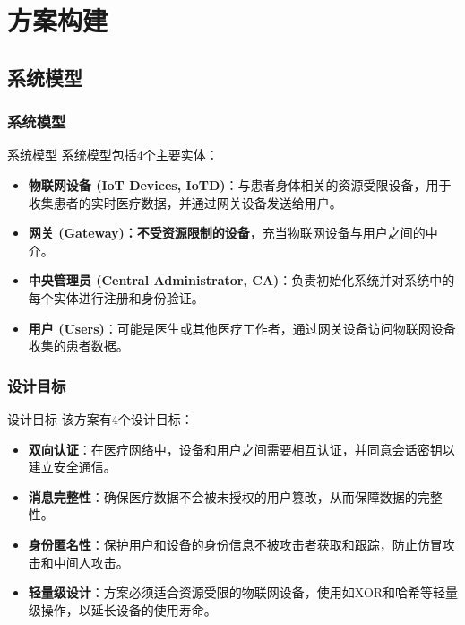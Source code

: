 \documentclass{beamer}
\begin{document}
\section{方案构建}

\subsection{系统模型}

\subsubsection{系统模型}
\begin{frame}{系统模型}
    系统模型包括4个主要实体：
    \begin{itemize}
        \item \textbf{物联网设备 (IoT Devices, IoTD)}：与患者身体相关的资源受限设备，用于收集患者的实时医疗数据，并通过网关设备发送给用户。
        \item \textbf{网关 (Gateway)：不受资源限制的设备}，充当物联网设备与用户之间的中介。
        \item \textbf{中央管理员 (Central Administrator, CA)}：负责初始化系统并对系统中的每个实体进行注册和身份验证。
        \item \textbf{用户 (Users)}：可能是医生或其他医疗工作者，通过网关设备访问物联网设备收集的患者数据。
    \end{itemize}
\end{frame}

\subsubsection{设计目标}
\begin{frame}{设计目标}
    该方案有4个设计目标：
    \begin{itemize}
        \item \textbf{双向认证}：在医疗网络中，设备和用户之间需要相互认证，并同意会话密钥以建立安全通信。
        \item \textbf{消息完整性}：确保医疗数据不会被未授权的用户篡改，从而保障数据的完整性。
        \item \textbf{身份匿名性}：保护用户和设备的身份信息不被攻击者获取和跟踪，防止仿冒攻击和中间人攻击。
        \item \textbf{轻量级设计}：方案必须适合资源受限的物联网设备，使用如XOR和哈希等轻量级操作，以延长设备的使用寿命。
    \end{itemize}
\end{frame}
\end{document}
